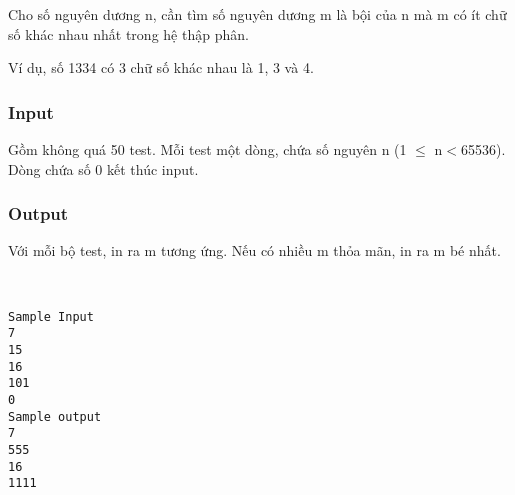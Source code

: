 

Cho số nguyên dương n, cần tìm số nguyên dương m là bội của n mà m có ít chữ số khác nhau nhất trong hệ thập phân.

Ví dụ, số 1334 có 3 chữ số khác nhau là 1, 3 và 4.

\subsubsection{Input}

Gồm không quá 50 test. Mỗi test một dòng, chứa số nguyên n (1 $\le$ n$<$65536).
\\Dòng chứa số 0 kết thúc input. 

\subsubsection{Output}

Với mỗi bộ test, in ra m tương ứng. Nếu có nhiều m thỏa mãn, in ra m bé nhất. 

 
\begin{verbatim}
Sample Input
7 
15 
16 
101 
0
Sample output
7
555
16
1111
       \end{verbatim}

 
